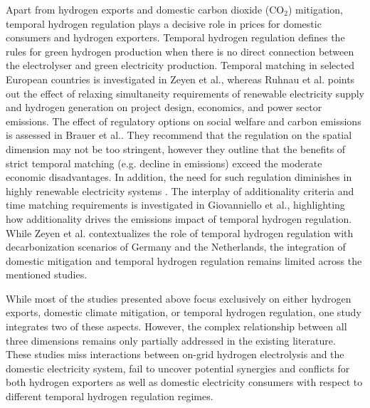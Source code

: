 Apart from hydrogen exports and domestic carbon dioxide (CO${}_2$) mitigation, temporal hydrogen regulation plays a decisive role in prices for domestic consumers and hydrogen exporters. 
Temporal hydrogen regulation defines the rules for green hydrogen production when there is no direct connection between the electrolyser and green electricity production.
Temporal matching in selected European countries is investigated in Zeyen et al.\cite{Zeyen2024}, whereas Ruhnau et al.\cite{Ruhnau2023} points out the effect of relaxing simultaneity requirements of renewable electricity supply and hydrogen generation on project design, economics, and power sector emissions.
The effect of regulatory options on social welfare and carbon emissions is assessed in Brauer et al.\cite{Brauer2022}. They recommend that the regulation on the spatial dimension may not be too stringent, however they outline that the benefits of strict temporal matching (e.g. decline in emissions) exceed the moderate economic disadvantages. In addition, the need for such regulation diminishes in highly renewable electricity systems \cite{Brauer2022}.
The interplay of additionality criteria and time matching requirements is investigated in Giovanniello et al.\cite{Giovanniello2024}, highlighting how additionality drives the emissions impact of temporal hydrogen regulation.
While Zeyen et al.\cite{Zeyen2024} contextualizes the role of temporal hydrogen regulation with decarbonization scenarios of Germany and the Netherlands, the integration of domestic \co mitigation and temporal hydrogen regulation remains limited across the mentioned studies.

While most of the studies presented above focus exclusively on either hydrogen exports, domestic climate mitigation, or temporal hydrogen regulation, one study\cite{Muller2024} integrates two of these aspects.
However, the complex relationship between all three dimensions remains only partially addressed in the existing literature.
These studies miss interactions between on-grid hydrogen electrolysis and the domestic electricity system, fail to uncover potential synergies and conflicts for both hydrogen exporters as well as domestic electricity consumers with respect to different temporal hydrogen regulation regimes.



